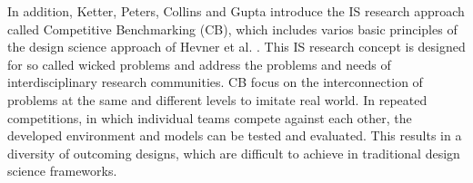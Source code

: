 In addition, Ketter, Peters, Collins and Gupta introduce the IS research approach called Competitive Benchmarking (CB), which includes varios basic principles of the design science approach of Hevner et al. . This IS research concept is designed for so called wicked problems and address the problems and needs of interdisciplinary research communities. CB focus on the interconnection of problems at the same and different levels to imitate real world. In repeated competitions, in which individual teams compete against each other, the developed environment and models can be tested and evaluated. This results in a diversity of outcoming designs, which are difficult to achieve in traditional design science frameworks.  

\clearpage